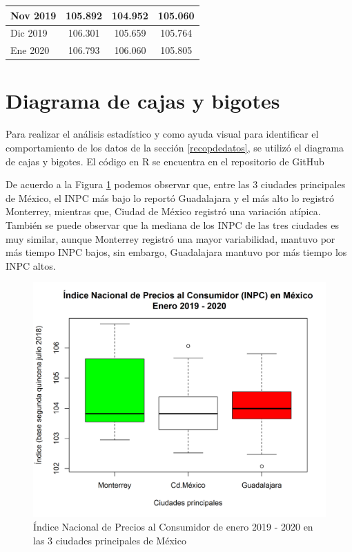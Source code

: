 \documentclass[fontsize=12pt]{article}
\begin{document}
\begin{table}[htp]
\begin{tabular}{|l|c|c|c|}
Nov 2019                             & 105.892            & 104.952                                                                                  & 105.060              \\ \hline
Dic 2019                             & 106.301            & 105.659                                                                                  & 105.764              \\ \hline
Ene 2020                             & 106.793            & 106.060                                                                                  & 105.805              \\ \hline
\end{tabular}
\end{table}


\section{Diagrama de cajas y bigotes}
Para realizar el análisis estadístico y como ayuda visual para identificar el comportamiento de los datos de la sección \ref{recopdedatos}, se utilizó el diagrama de cajas y bigotes. El código en R se encuentra en el repositorio de GitHub \cite{github}

De acuerdo a la Figura \ref{PrincipalesCiudades} podemos observar que, entre las 3 ciudades principales de México, el INPC más bajo lo reportó Guadalajara y el más alto lo registró Monterrey, mientras que, Ciudad de México registró una variación atípica. También se puede observar que la mediana de los INPC de las tres ciudades es muy similar, aunque Monterrey registró una mayor variabilidad, mantuvo por más tiempo INPC bajos, sin embargo, Guadalajara mantuvo por más tiempo los INPC altos.


\begin{figure}[htp]
\centering
\includegraphics[scale=0.8]{PrincipalesCiudades}
\caption{Índice Nacional de Precios al Consumidor de enero 2019 - 2020 en las 3 ciudades principales de México}
\label{PrincipalesCiudades}
\end{figure}
\end{document}
